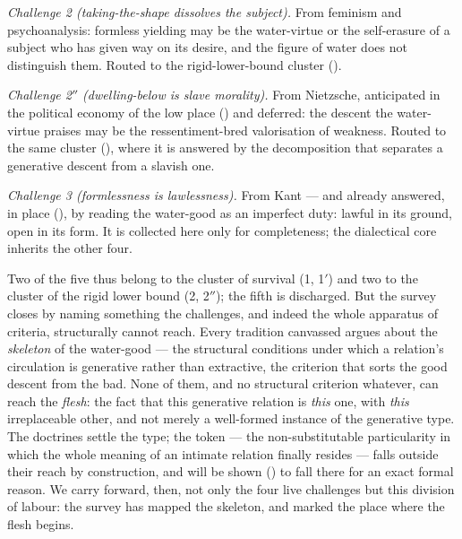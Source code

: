 \emph{Challenge 2 (taking-the-shape dissolves the subject).} From feminism and psychoanalysis: formless yielding may be the water-virtue or the self-erasure of a subject who has given way on its desire, and the figure of water does not distinguish them. Routed to the rigid-lower-bound cluster ().

\emph{Challenge 2$''$ (dwelling-below is slave morality).} From Nietzsche, anticipated in the political economy of the low place () and deferred: the descent the water-virtue praises may be the ressentiment-bred valorisation of weakness. Routed to the same cluster (), where it is answered by the decomposition that separates a generative descent from a slavish one.

\emph{Challenge 3 (formlessness is lawlessness).} From Kant --- and already answered, in place (), by reading the water-good as an imperfect duty: lawful in its ground, open in its form. It is collected here only for completeness; the dialectical core inherits the other four.

Two of the five thus belong to the cluster of survival (1, 1$'$) and two to the cluster of the rigid lower bound (2, 2$''$); the fifth is discharged. But the survey closes by naming something the challenges, and indeed the whole apparatus of criteria, structurally cannot reach. Every tradition canvassed argues about the \emph{skeleton} of the water-good --- the structural conditions under which a relation's circulation is generative rather than extractive, the criterion that sorts the good descent from the bad. None of them, and no structural criterion whatever, can reach the \emph{flesh}: the fact that this generative relation is \emph{this} one, with \emph{this} irreplaceable other, and not merely a well-formed instance of the generative type. The doctrines settle the type; the token --- the non-substitutable particularity in which the whole meaning of an intimate relation finally resides --- falls outside their reach by construction, and will be shown () to fall there for an exact formal reason. We carry forward, then, not only the four live challenges but this division of labour: the survey has mapped the skeleton, and marked the place where the flesh begins.
